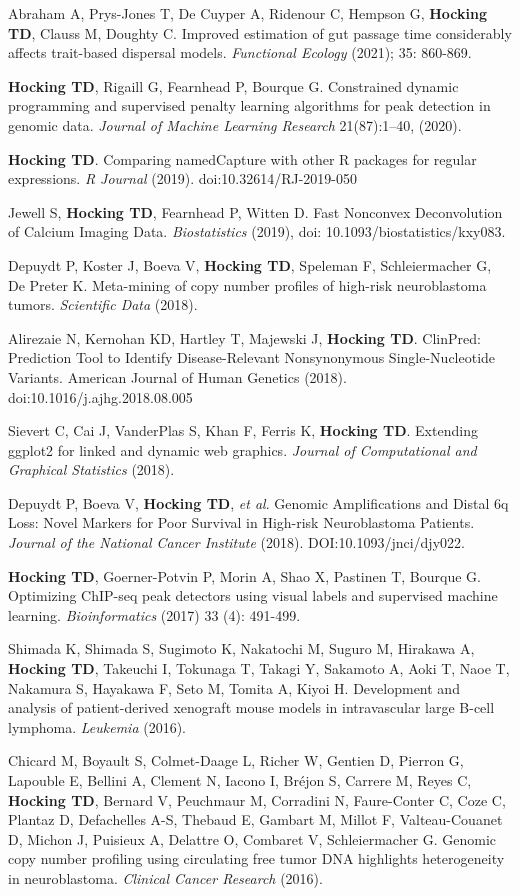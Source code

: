 \documentclass[margin,line]{res}
\begin{document}
\begin{resume}
Abraham A, Prys-Jones T, De Cuyper A, Ridenour C, Hempson G, {\bf
  Hocking TD}, Clauss M, Doughty C. Improved estimation of gut passage
time considerably affects trait-based dispersal models. {\it
  Functional Ecology} (2021); 35: 860-869.

{\bf Hocking TD}, Rigaill G, Fearnhead P, Bourque G. Constrained
dynamic programming and supervised penalty learning algorithms for
peak detection in genomic data. {\it Journal of Machine Learning
  Research} 21(87):1--40, (2020).

{\bf Hocking TD}. Comparing namedCapture with other R packages for
regular expressions. {\it R Journal} (2019). doi:10.32614/RJ-2019-050

Jewell S, {\bf Hocking TD}, Fearnhead P, Witten D. Fast Nonconvex
Deconvolution of Calcium Imaging Data. {\it Biostatistics} (2019), doi:
10.1093/biostatistics/kxy083.

Depuydt P, Koster J, Boeva V, {\bf Hocking TD}, Speleman F,
Schleiermacher G, De Preter K. Meta-mining of copy number profiles of
high-risk neuroblastoma tumors. {\it Scientific Data} (2018).

Alirezaie N, Kernohan KD, Hartley T, Majewski J, {\bf Hocking
  TD}. ClinPred: Prediction Tool to Identify Disease-Relevant
Nonsynonymous Single-Nucleotide Variants. American Journal of Human
Genetics (2018). doi:10.1016/j.ajhg.2018.08.005

Sievert C, Cai J, VanderPlas S, Khan F, Ferris K, {\bf Hocking
  TD}. Extending ggplot2 for linked and dynamic web graphics. {\it
  Journal of Computational and Graphical Statistics} (2018).

Depuydt P, Boeva V, {\bf Hocking TD}, {\it et al}. Genomic
Amplifications and Distal 6q Loss: Novel Markers for Poor Survival in
High-risk Neuroblastoma Patients. {\it Journal of the National Cancer
  Institute} (2018). DOI:10.1093/jnci/djy022.

{\bf Hocking TD}, Goerner-Potvin P, Morin A, Shao X, Pastinen T,
Bourque G. Optimizing ChIP-seq peak detectors using visual labels and
supervised machine learning. {\it Bioinformatics} (2017) 33 (4): 491-499.

Shimada K, Shimada S, Sugimoto K, Nakatochi M, Suguro M, Hirakawa A,
{\bf Hocking TD}, Takeuchi I, Tokunaga T, Takagi Y, Sakamoto A, Aoki T, Naoe
T, Nakamura S, Hayakawa F, Seto M, Tomita A, Kiyoi H. Development and
analysis of patient-derived xenograft mouse models in intravascular
large B-cell lymphoma. {\it Leukemia} (2016).

Chicard M, Boyault S, Colmet-Daage L, Richer W, Gentien D, Pierron G,
Lapouble E, Bellini A, Clement N, Iacono I, Bréjon S, Carrere M, Reyes
C, {\bf Hocking TD}, Bernard V, Peuchmaur M, Corradini N, Faure-Conter
C, Coze C, Plantaz D, Defachelles A-S, Thebaud E, Gambart M, Millot F,
Valteau-Couanet D, Michon J, Puisieux A, Delattre O, Combaret V,
Schleiermacher G. Genomic copy number profiling using circulating free
tumor DNA highlights heterogeneity in neuroblastoma. {\it Clinical Cancer
Research} (2016).


\end{resume}
\end{document}
